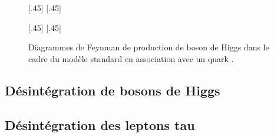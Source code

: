 \begin{figure}[h]
\centering
\vspace{\baselineskip}
\subcaptionbox{\label{subfig-fgraph-Higgs_with_b_gg_g_bbh}}[.45\textwidth]
{\vspace{\baselineskip}}
\qquad
\subcaptionbox{\label{subfig-fgraph-Higgs_with_b_qq_g_bbh}}[.45\textwidth]
{\vspace{\baselineskip}}

\vspace{\baselineskip}
\subcaptionbox{\label{subfig-fgraph-Higgs_with_b_gg_hbb}}[.45\textwidth]
{\vspace{\baselineskip}}
\qquad
\subcaptionbox{\label{subfig-fgraph-Higgs_with_b_bg_b_bh}}[.45\textwidth]
{\vspace{\baselineskip}}

\caption{Diagrammes de Feynman de production de boson de Higgs dans le cadre du modèle standard en association avec un quark \quarkb.}
\label{fig-fgraph-Higgs_prod_with_b}
\end{figure}










\subsection{Désintégration de bosons de Higgs}\label{chapter-MS-MSSM-section-pheno_Higgs_MSSM-subsec-desintegration_Higgs}



\subsection{Désintégration des leptons tau}\label{chapter-MS-MSSM-section-pheno_Higgs_MSSM-subsec-desintegration_lepton_tau}



